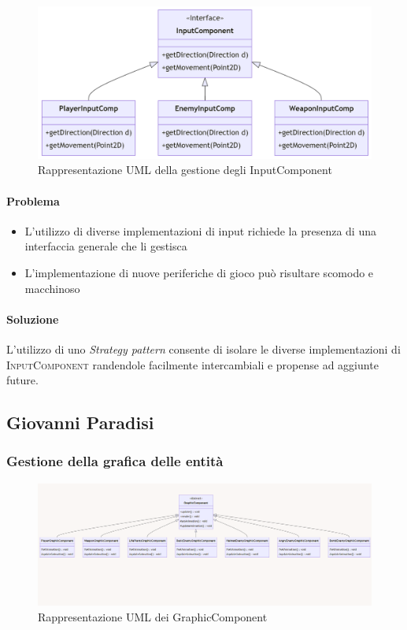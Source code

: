 \documentclass[a4paper,12pt]{report}
\begin{document}
\begin{figure}[H]
\centering{}
\includegraphics[width=\textwidth,keepaspectratio]{img/InputComponentUML.png}
\caption{Rappresentazione UML della gestione degli InputComponent}
\end{figure}

\paragraph{Problema}
\begin{itemize}
    \item L'utilizzo di diverse implementazioni di input richiede la presenza di una interfaccia generale che li gestisca
    \item L'implementazione di nuove periferiche di gioco può risultare scomodo e macchinoso
\end{itemize}
\paragraph{Soluzione}
L'utilizzo di uno \textit{Strategy pattern} consente di isolare le diverse implementazioni di \textsc{InputComponent} randendole facilmente intercambiali e propense ad aggiunte future.
    
\subsection*{Giovanni Paradisi}

\subsubsection{Gestione della grafica delle entità}
\begin{figure}[H]
\centering{}
\includegraphics[width=\textwidth,keepaspectratio]{img/GraphicComponentUML.png}
\caption{Rappresentazione UML dei GraphicComponent}
\end{figure}
\end{document}
